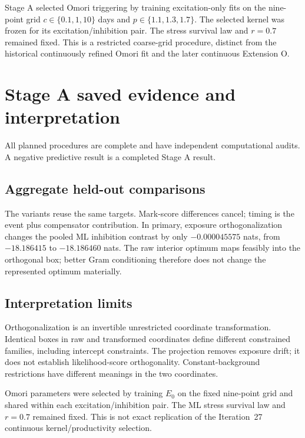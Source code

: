 Stage A selected Omori triggering by training excitation-only fits on the
nine-point grid $c\in\{0.1,1,10\}$ days and $p\in\{1.1,1.3,1.7\}$.
The selected kernel was frozen for its excitation/inhibition pair. The stress
survival law and $r=0.7$ remained fixed. This is a restricted coarse-grid
procedure, distinct from the historical continuously refined Omori fit and
the later continuous Extension O.
\section{Stage A saved evidence and interpretation}


All planned procedures are complete and have independent computational audits. A negative predictive result is a completed Stage A result.

\subsection{Aggregate held-out comparisons}


The variants reuse the same targets. Mark-score differences cancel; timing is the event plus compensator contribution. In primary, exposure orthogonalization changes the pooled ML inhibition contrast by only \(-0.000045575\) nats, from \(-18.186415\) to \(-18.186460\) nats. The raw interior optimum maps feasibly into the orthogonal box; better Gram conditioning therefore does not change the represented optimum materially.





\subsection{Interpretation limits}


Orthogonalization is an invertible unrestricted coordinate transformation. Identical boxes in raw and transformed coordinates define different constrained families, including intercept constraints. The projection removes exposure drift; it does not establish likelihood-score orthogonality. Constant-background restrictions have different meanings in the two coordinates.

Omori parameters were selected by training $E_0$ on the fixed nine-point grid and shared within each excitation/inhibition pair. The ML stress survival law and $r=0.7$ remained fixed. This is not exact replication of the Iteration~27 continuous kernel/productivity selection.

